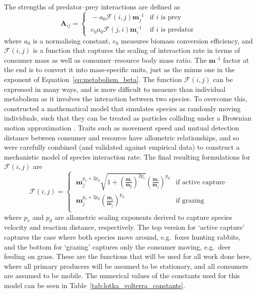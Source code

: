 The strengths of predator--prey interactions are defined as
\begin{equation}
  \mathbf{A}_{ij} =
  \begin{cases}
    \;-a_0\mathcal{F}(i,j)\mathbf{m}_j^{\text{--}1} & \text{if $i$ is prey}\\
    \;e_0a_0\mathcal{F}(j,i)\mathbf{m}_i^{\text{--}1} & \text{if $i$ is predator}
  \end{cases}
  \label{eq:interaction_strength}
\end{equation}
where $a_0$ is a normalising constant, $e_0$ measures biomass conversion efficiency, and $\mathcal{F}(i,j)$ is a function that captures the scaling of interaction rate in terms of consumer mass as well as consumer--resource body mass ratio. The $\mathbf{m}^{\text{--}1}$ factor at the end is to convert it into mass-specific units, just as the minus one in the exponent of Equation~\eqref{eq:metabolism_beta}.
The function $\mathcal{F}(i,j)$ can be expressed in many ways, and is more difficult to measure than individual metabolism as it involves the interaction between two species. To overcome this, \citet{Pawar2012} constructed a mathematical model that simulates species as randomly moving individuals, such that they can be treated as particles colliding under a Brownian motion approximation \citep{Ocubo1980}. Traits such as movement speed and mutual detection distance between consumer and resource have allometric relationships, and so were carefully combined (and validated against empirical data) to construct a mechanistic model of species interaction rate.
The final resulting formulations for $\mathcal{F}(i,j)$ are
\begin{equation}
  \mathcal{F}(i,j) =
  \begin{cases}
    \;\mathbf{m}_j^{p_v+2p_d} \sqrt{1+\left(\frac{\mathbf{m}_i}{\mathbf{m_j}}\right)^{2p_v}}\left(\frac{\mathbf{m}_i}{\mathbf{m}_j}\right)^{p_d} & \text{if active capture}\\
    \;\mathbf{m}_j^{p_v+2p_d} \left(\frac{\mathbf{m}_i}{\mathbf{m}_j}\right)^{p_d} & \text{if grazing}\\
  \end{cases}
\end{equation}
where $p_v$ and $p_d$ are allometric scaling exponents derived to capture species velocity and reaction distance, respectively. The top version for `active capture' captures the case where both species move around, e.g.\ foxes hunting rabbits, and the bottom for `grazing' captures only the consumer moving, e.g.\ deer feeding on grass. These are the functions that will be used for all work done here, where all primary producers will be assumed to be stationary, and all consumers are assumed to be mobile.
The numerical values of the constants used for this model can be seen in Table~\ref{tab:lotka_volterra_constants}.


